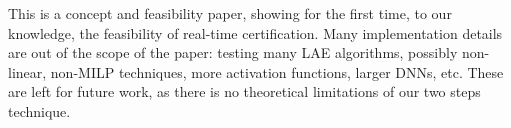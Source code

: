 \documentclass{article}
\begin{document}
	This is a concept and feasibility paper, showing for the first time, to our knowledge, the feasibility 
	of real-time certification. Many implementation details are out of the scope of the paper: testing many LAE algorithms, possibly non-linear, non-MILP techniques, more activation functions, larger DNNs, etc.
	These are left for future work, as there is no theoretical limitations of our two steps technique.

	\newpage
	
	
	
	
	\newpage
	
\appendix

	
\end{document}
